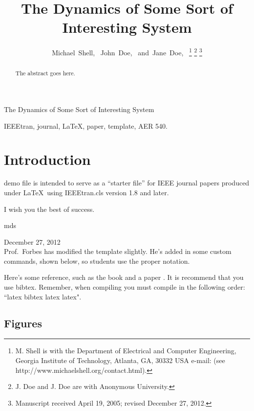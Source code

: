 \documentclass[journal]{IEEEtran}
\begin{document}
\title{The Dynamics of Some Sort of Interesting System}

\author{Michael~Shell,~
        John~Doe,~
        and~Jane~Doe,~
\thanks{M. Shell is with the Department
of Electrical and Computer Engineering, Georgia Institute of Technology, Atlanta,
GA, 30332 USA e-mail: (see http://www.michaelshell.org/contact.html).}
\thanks{J. Doe and J. Doe are with Anonymous University.}
\thanks{Manuscript received April 19, 2005; revised December 27, 2012.}}

{The Dynamics of Some Sort of Interesting System}

\maketitle

\begin{abstract}
The abstract goes here.
\end{abstract}

\begin{IEEEkeywords}
IEEEtran, journal, \LaTeX, paper, template, AER 540. 
\end{IEEEkeywords}

\IEEEpeerreviewmaketitle

\section{Introduction}

 demo file is intended to serve as a ``starter file''
for IEEE journal papers produced under \LaTeX\ using
IEEEtran.cls version 1.8 and later.

I wish you the best of success.

\hfill mds
 
\hfill December 27, 2012 \\

Prof.\ Forbes has modified the template slightly. He's added in some custom commands, shown below, so students use the proper notation. 

Here's some reference, such as the book \cite{book_gabe_glenn} and a paper \cite{paper_shuster_1981}. It is recommend that you use bibtex. Remember, when compiling you must compile in the following order: ``latex bibtex latex latex". 

\subsection{Figures}
\label{sec:figure_section}
\end{document}
